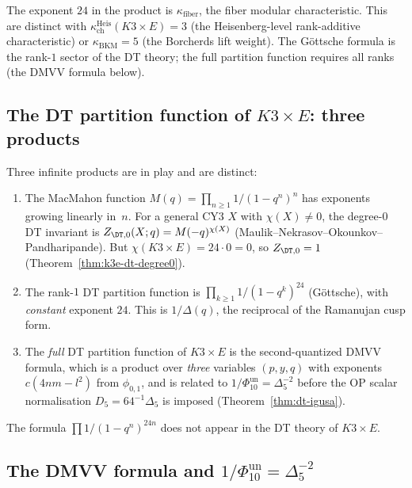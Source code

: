 The exponent $24$ in the product is $\kappa_{\mathrm{fiber}}$, the fiber modular characteristic. This are distinct with $\kappa_{\mathrm{ch}}^{\mathrm{Heis}}(K3 \times E) = 3$ (the Heisenberg-level rank-additive characteristic) or $\kappa_{\mathrm{BKM}} = 5$ (the Borcherds lift weight). The G\"ottsche formula is the rank-$1$ sector of the DT theory; the full partition function requires all ranks (the DMVV formula below).

\subsection{The DT partition function of \texorpdfstring{$K3 \times E$}{K3 x E}: three products}
\label{subsec:k3e-dt-three-products}

Three infinite products are in play and are distinct:

\begin{enumerate}[label=(\roman*)]
\item The MacMahon function $M(q) = \prod_{n \geq 1} 1/(1-q^n)^n$ has exponents growing linearly in~$n$. For a general CY3 $X$ with $\chi(X) \neq 0$, the degree-$0$ DT invariant is $Z_{\DT,0}(X; q) = M(-q)^{\chi(X)}$ (Maulik--Nekrasov--Okounkov--Pandharipande). But $\chi(K3 \times E) = 24 \cdot 0 = 0$, so $Z_{\DT,0} = 1$ (Theorem~\ref{thm:k3e-dt-degree0}).

\item The rank-$1$ DT partition function is $\prod_{k \geq 1} 1/(1-q^k)^{24}$ (G\"ottsche), with \emph{constant} exponent $24$. This is $1/\Delta(q)$, the reciprocal of the Ramanujan cusp form.

\item The \emph{full} DT partition function of $K3 \times E$ is the second-quantized DMVV formula, which is a product over \emph{three} variables $(p, y, q)$ with exponents $c(4nm - l^2)$ from $\phi_{0,1}$, and is related to \(1/\Phi_{10}^{\mathrm{un}}=\Delta_5^{-2}\) before the OP scalar normalisation \(D_5=64^{-1}\Delta_5\) is imposed (Theorem~\ref{thm:dt-igusa}).
\end{enumerate}

The formula $\prod 1/(1-q^n)^{24n}$ does not appear in the DT theory of $K3 \times E$.

\subsection{The DMVV formula and \texorpdfstring{$1/\Phi_{10}^{\mathrm{un}}=\Delta_5^{-2}$}{1/Phi-10-un = Delta-5-2}}
\label{subsec:k3e-dmvv-vs-delta5}

